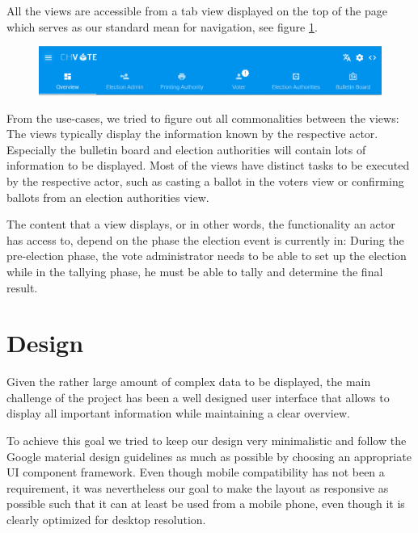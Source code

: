 All the views are accessible from a tab view displayed on the top of the page which serves as our standard mean for navigation, see figure \ref{Navigation}.

\begin{figure}[p]
\begin{center}
\includegraphics[scale=0.44]{assets/screenshots/navigation.png}
\label{Navigation}%
\end{center}
\end{figure}

From the use-cases, we tried to figure out all commonalities between the views: The views typically display the information known by the respective actor. Especially the bulletin board and election authorities will contain lots of information to be displayed. Most of the views have distinct tasks to be executed by the respective actor, such as casting a ballot in the voters view or confirming ballots from an election authorities view.

The content that a view displays, or in other words, the functionality an actor has access to, depend on the phase the election event is currently in: During the pre-election phase, the vote administrator needs to be able to set up the election while in the tallying phase, he must be able to tally and determine the final result.


\section{Design}
Given the rather large amount of complex data to be displayed, the main challenge of the project has been a well designed user interface that allows to display all important information while maintaining a clear overview.

To achieve this goal we tried to keep our design very minimalistic and follow the Google material design guidelines as much as possible by choosing an appropriate UI component framework. Even though mobile compatibility has not been a requirement, it was nevertheless our goal to make the layout as responsive as possible such that it can at least be used from a mobile phone, even though it is clearly optimized for desktop resolution.

